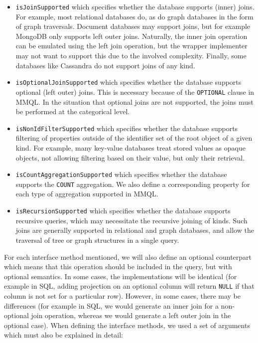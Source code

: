 \begin{itemize}
    \item \texttt{isJoinSupported} which specifies whether the database supports (inner) joins. For example, most relational databases do, as do graph databases in the form of graph traversals. Document databases may support joins, but for example MongoDB only supports left outer joins. Naturally, the inner join operation can be emulated using the left join operation, but the wrapper implementer may not want to support this due to the involved complexity. Finally, some databases like Cassandra do not support joins of any kind.
    \item \texttt{isOptionalJoinSupported} which specifies whether the database supports optional (left outer) joins. This is necessary because of the \texttt{OPTIONAL} clause in MMQL. In the situation that optional joins are not supported, the joins must be performed at the categorical level.
    \item \texttt{isNonIdFilterSupported} which specifies whether the database supports filtering of properties outside of the identifier set of the root object of a given kind. For example, many key-value databases treat stored values as opaque objects, not allowing filtering based on their value, but only their retrieval.
    \item \texttt{isCountAggregationSupported} which specifies whether the database supports the \texttt{COUNT} aggregation. We also define a corresponding property for each type of aggregation supported in MMQL.
    \item \texttt{isRecursionSupported} which specifies whether the database supports recursive queries, which may necessitate the recursive joining of kinds. Such joins are generally supported in relational and graph databases, and allow the traversal of tree or graph structures in a single query.
\end{itemize}

For each interface method mentioned, we will also define an optional counterpart which means that this operation should be included in the query, but with optional semantics.
In some cases, the implementations will be identical (for example in SQL, adding projection on an optional column will return \texttt{NULL} if that column is not set for a particular row).
However, in some cases, there may be differences (for example in SQL, we would generate an inner join for a non-optional join operation, whereas we would generate a left outer join in the optional case).
When defining the interface methods, we used a set of arguments which must also be explained in detail:

